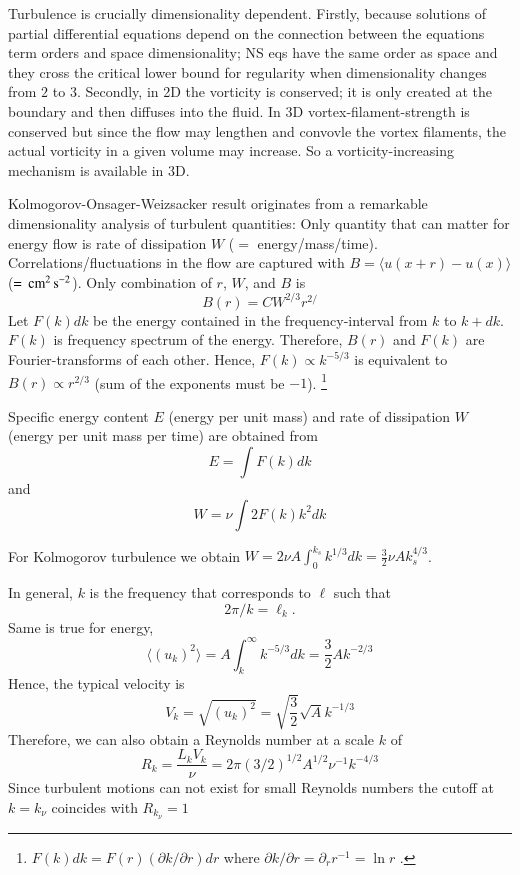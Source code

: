 \documentclass[usenatbib,twocolumn]{aastex63}
\begin{document}
\begin{appendix}
Turbulence is crucially dimensionality dependent.
Firstly, because solutions of partial differential equations depend on the connection between the equations term orders and space dimensionality;
NS eqs have the same order as space and they cross the critical lower bound for regularity when dimensionality changes from $2$ to $3$.
Secondly, in 2D the vorticity is conserved; it is only created at the boundary and then diffuses into the fluid.
In 3D vortex-filament-strength is conserved but since the flow may lengthen and convovle the vortex filaments, the actual vorticity in a given volume may increase.
So a vorticity-increasing mechanism is available in 3D.

Kolmogorov-Onsager-Weizsacker result originates from a remarkable dimensionality analysis of turbulent quantities:
Only quantity that can matter for energy flow is rate of dissipation $W$ ($=$ energy/mass/time).
Correlations/fluctuations in the flow are captured with $B = \langle u(x+r) - u(x) \rangle$ ($= \, \mathrm{cm}^2 \, \mathrm{s}^{-2}$).
Only combination of $r$, $W$, and $B$ is 
\begin{equation}
    B(r) = C W^{2/3} r^{2/}
\end{equation}
Let $F(k)dk$ be the energy contained in the frequency-interval from $k$ to $k+dk$.
$F(k)$ is frequency spectrum of the energy.
Therefore, $B(r)$ and $F(k)$ are Fourier-transforms of each other.
Hence, $F(k) \propto k^{-5/3}$ is equivalent to $B(r) \propto r^{2/3}$ (sum of the exponents must be $-1$).
\footnote{
    $F(k) dk = F(r) (\partial k/\partial r) dr$ where $\partial k/\partial r = \partial_r r^{-1} = \ln r$ .
}

Specific energy content $E$ (energy per unit mass) and rate of dissipation $W$ (energy per unit mass per time) are obtained from
\begin{equation}
    E = \int F(k) dk
\end{equation}
and
\begin{equation}
    W = \nu \int 2 F(k) k^2 dk
\end{equation}

For Kolmogorov turbulence we obtain $W = 2 \nu A \int_0^{k_s} k^{1/3} dk = \frac{3}{2} \nu A k_s^{4/3}$.

In general, $k$ is the frequency that corresponds to $\ell$ such that 
\begin{equation}
2\pi/k = \ell_k.
\end{equation}
Same is true for energy, 
\begin{equation}
    \langle (u_k)^2 \rangle = A \int_k^\infty k^{-5/3} dk = \frac{3}{2} A k^{-2/3}
\end{equation}
Hence, the typical velocity is
\begin{equation}
    V_k = \sqrt{(u_k)^2} = \sqrt{\frac{3}{2}} \sqrt{A} k^{-1/3}
\end{equation}
Therefore, we can also obtain a Reynolds number at a scale $k$ of
\begin{equation}
    R_k = \frac{L_k V_k}{\nu} = 2\pi (3/2)^{1/2} A^{1/2} \nu^{-1} k^{-4/3}
\end{equation}
Since turbulent motions can not exist for small Reynolds numbers the cutoff at $k = k_\nu$ coincides with $R_{k_\nu} = 1$


\end{appendix}
\end{document}
